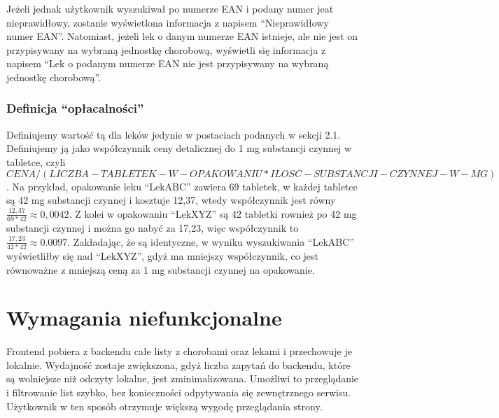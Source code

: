\documentclass{article}
\begin{document}
      Jeżeli jednak użytkownik wyszukiwał po numerze EAN i podany numer jeat nieprawidłowy, zostanie wyświetlona informacja z napisem ``Nieprawidłowy numer EAN''.
      Natomiast, jeżeli lek o danym numerze EAN istnieje, ale nie jest on przypisywany na wybraną jednostkę chorobową,
      wyświetli się informacja z napisem ``Lek o podanym numerze EAN nie jest przypisywany na wybraną jednostkę chorobową''.

      \subsubsection{Definicja ``opłacalności''}
      Definiujemy wartość tą dla leków jedynie w postaciach podanych w sekcji 2.1.
      Definiujemy ją jako współczynnik ceny detalicznej do 1 mg substancji czynnej w tabletce,
      czyli $CENA / (LICZBA-TABLETEK-W-OPAKOWANIU * ILOSC-SUBSTANCJI-CZYNNEJ-W-MG)$.
      Na przykład, opakowanie leku ``LekABC'' zawiera 69 tabletek, w każdej tabletce są 42 mg substancji czynnej i kosztuje 12,37,
      wtedy współczynnik jest równy $\frac{12,37}{69 * 42} \approx 0,0042$.
      Z kolei w opakowaniu ``LekXYZ'' są 42 tabletki rownież po 42 mg substancji czynnej i można go nabyć za 17,23,
      więc współczynnik to $\frac{17,23}{42 * 42} \approx 0.0097$.
      Zakładając, że są identyczne, w wyniku wyszukiwania ``LekABC'' wyświetliłby się nad ``LekXYZ'', gdyż ma mniejszy współczynnik,
      co jest równoważne z mniejszą ceną za 1 mg substancji czynnej na opakowanie.

  \section{Wymagania niefunkcjonalne}
  Frontend pobiera z backendu całe listy z chorobami oraz lekami i przechowuje je lokalnie.
  Wydajność zostaje zwiększona, gdyż liczba zapytań do backendu, które są wolniejsze niż odczyty lokalne, jest zminimalizowana.
  Umożliwi to przeglądanie i filtrowanie list szybko, bez konieczności odpytywania się zewnętrznego serwisu.
  Użytkownik w ten sposób otrzymuje większą wygodę przeglądania strony.
\end{document}
